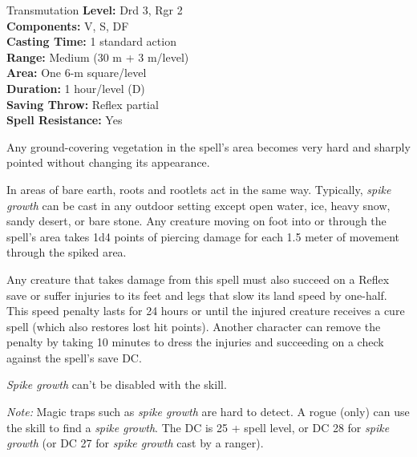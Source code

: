 {Transmutation}
{
	\textbf{Level:}
	Drd 3, Rgr 2\\
	\textbf{Components:}
	V, S, DF\\
	\textbf{Casting Time:}
	1 standard action\\
	\textbf{Range:}
	Medium (30 m + 3 m/level)\\
	\textbf{Area:}
	One 6-m square/level\\
	\textbf{Duration:}
	1 hour/level (D)\\
	\textbf{Saving Throw:}
	Reflex partial\\
	\textbf{Spell Resistance:}
	Yes\\
}
{
	Any ground-covering vegetation in the spell's area becomes very hard and sharply pointed without changing its appearance.

	In areas of bare earth, roots and rootlets act in the same way. Typically, \emph{spike growth} can be cast in any outdoor setting except open water, ice, heavy snow, sandy desert, or bare stone. Any creature moving on foot into or through the spell's area takes 1d4 points of piercing damage for each 1.5 meter of movement through the spiked area.

	Any creature that takes damage from this spell must also succeed on a Reflex save or suffer injuries to its feet and legs that slow its land speed by one-half. This speed penalty lasts for 24 hours or until the injured creature receives a cure spell (which also restores lost hit points). Another character can remove the penalty by taking 10 minutes to dress the injuries and succeeding on a  check against the spell's save DC.

	\emph{Spike growth} can't be disabled with the  skill.

	\textit{Note:} Magic traps such as \emph{spike growth} are hard to detect. A rogue (only) can use the  skill to find a \emph{spike growth}. The DC is 25 + spell level, or DC 28 for \emph{spike growth} (or DC 27 for \emph{spike growth} cast by a ranger).

}
